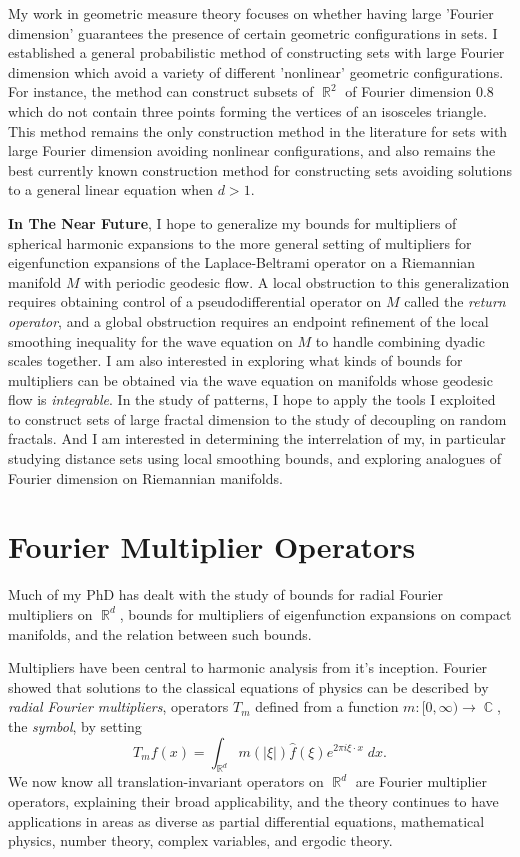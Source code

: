 \documentclass[12pt]{article}
\DeclareMathOperator{\RR}{\mathbb{R}}
\DeclareMathOperator{\CC}{\mathbb{C}}
\begin{document}
My work in geometric measure theory focuses on whether having large 'Fourier dimension' guarantees the presence of certain geometric configurations in sets. I established a general probabilistic method of constructing sets with large Fourier dimension which avoid a variety of different 'nonlinear' geometric configurations. For instance, the method can construct subsets of $\RR^2$ of Fourier dimension $0.8$ which do not contain three points forming the vertices of an isosceles triangle. This method remains the only construction method in the literature for sets with large Fourier dimension avoiding nonlinear configurations, and also remains the best currently known construction method for constructing sets avoiding solutions to a general linear equation when $d > 1$.

{\bf In The Near Future}, I hope to generalize my bounds for multipliers of spherical harmonic expansions to the more general setting of multipliers for eigenfunction expansions of the Laplace-Beltrami operator on a Riemannian manifold $M$ with periodic geodesic flow. A local obstruction to this generalization requires obtaining control of a pseudodifferential operator on $M$ called the \emph{return operator}, and a global obstruction requires an endpoint refinement of the local smoothing inequality for the wave equation on $M$ to handle combining dyadic scales together. I am also interested in exploring what kinds of bounds for multipliers can be obtained via the wave equation on manifolds whose geodesic flow is \emph{integrable}. In the study of patterns, I hope to apply the tools I exploited to construct sets of large fractal dimension to the study of decoupling on random fractals. And I am interested in determining the interrelation of my, in particular studying distance sets using local smoothing bounds, and exploring analogues of Fourier dimension on Riemannian manifolds.

\pagebreak[3]






\section*{Fourier Multiplier Operators}

Much of my PhD has dealt with the study of bounds for radial Fourier multipliers on $\RR^d$, bounds for multipliers of eigenfunction expansions on compact manifolds, and the relation between such bounds.

Multipliers have been central to harmonic analysis from it's inception. Fourier showed that solutions to the classical equations of physics can be described by \emph{radial Fourier multipliers}, operators $T_m$ defined from a function $m: [0,\infty) \to \CC$, the \emph{symbol}, by setting
%
\[ T_mf(x) = \int_{\RR^d} m(|\xi|) \widehat{f}(\xi) e^{2 \pi i \xi \cdot x}\; dx. \]
%
We now know all translation-invariant operators on $\RR^d$ are Fourier multiplier operators, explaining their broad applicability, and the theory continues to have applications in areas as diverse as partial differential equations, mathematical physics, number theory, complex variables, and ergodic theory.
\end{document}
